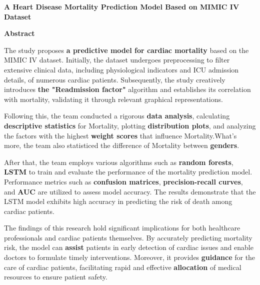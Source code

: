 \documentclass[13pt]{ctexart}
\begin{document}
\setmainfont{Times New Roman}
\thispagestyle{empty}

{\centering\fontsize{18}{16}\selectfont\textbf{{A Heart Disease Mortality Prediction Model Based on MIMIC IV Dataset}}\par}
\vspace{10pt} 

{\centering\fontsize{13}{10}\selectfont\textbf{{Abstract}}\par}
\vspace{10pt}

\fontsize{13}{12.5}\selectfont

\begin{adjustwidth}{1cm}{1cm}

\indent{ }{ }{ }{ }{ }{ } The study proposes \textbf{a predictive model for cardiac mortality} based on the MIMIC IV dataset. Initially, the dataset undergoes preprocessing to filter extensive clinical data, including physiological indicators and ICU admission details, of numerous cardiac patients. Subsequently, the study creatively introduces \textbf{the "Readmission factor"} algorithm and establishes its correlation with mortality, validating it through relevant graphical representations.

Following this, the team conducted a rigorous \textbf{data analysis}, calculating \textbf{descriptive statistics} for Mortality, plotting \textbf{distribution plots}, and analyzing the factors with the highest \textbf{weight scores} that influence Mortality.What's more, the team also statisticed the difference of Mortality between \textbf{genders}.

After that, the team employs various algorithms such as \textbf{random forests}, \textbf{LSTM} to train and evaluate the performance of the mortality prediction model. Performance metrics such as \textbf{confusion matrices}, \textbf{precision-recall curves}, and \textbf{AUC} are utilized to assess model accuracy. The results demonstrate that the LSTM model exhibits high accuracy in predicting the risk of death among cardiac patients.

The findings of this research hold significant implications for both healthcare professionals and cardiac patients themselves. By accurately predicting mortality risk, the model can \textbf{assist} patients in early detection of cardiac issues and enable doctors to formulate timely interventions. Moreover, it provides \textbf{guidance} for the care of cardiac patients, facilitating rapid and effective \textbf{allocation} of medical resources to ensure patient safety.


\end{adjustwidth}
\end{document}
